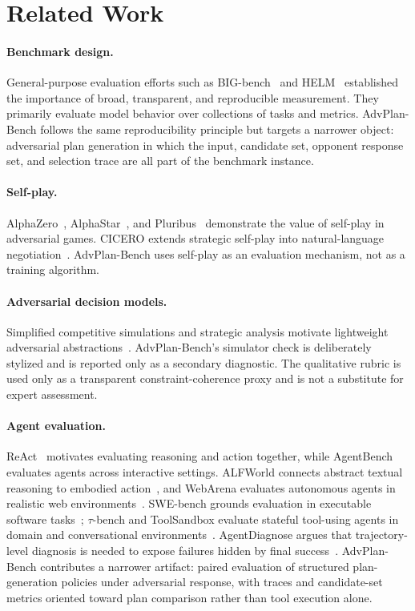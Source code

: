 \documentclass[letterpaper]{article} %
\begin{document}
\section{Related Work}

\paragraph{Benchmark design.}
General-purpose evaluation efforts such as BIG-bench~\citep{srivastava2023beyond} and HELM~\citep{liang2023holistic} established the importance of broad, transparent, and reproducible measurement. They primarily evaluate model behavior over collections of tasks and metrics. AdvPlan-Bench follows the same reproducibility principle but targets a narrower object: adversarial plan generation in which the input, candidate set, opponent response set, and selection trace are all part of the benchmark instance.

\paragraph{Self-play.}
AlphaZero~\citep{silver2018alphazero}, AlphaStar~\citep{vinyals2019alphastar}, and Pluribus~\citep{brown2019superhuman} demonstrate the value of self-play in adversarial games. CICERO extends strategic self-play into natural-language negotiation~\citep{bakhtin2022cicero}. AdvPlan-Bench uses self-play as an evaluation mechanism, not as a training algorithm.

\paragraph{Adversarial decision models.}
Simplified competitive simulations and strategic analysis motivate lightweight adversarial abstractions~\citep{lanchester1916,schelling1960}. AdvPlan-Bench's simulator check is deliberately stylized and is reported only as a secondary diagnostic. The qualitative rubric is used only as a transparent constraint-coherence proxy and is not a substitute for expert assessment.

\paragraph{Agent evaluation.}
ReAct~\citep{yao2023react} motivates evaluating reasoning and action together, while AgentBench~\citep{liu2024agentbench} evaluates agents across interactive settings. ALFWorld connects abstract textual reasoning to embodied action~\citep{shridhar2021alfworld}, and WebArena evaluates autonomous agents in realistic web environments~\citep{zhou2024webarena}. SWE-bench grounds evaluation in executable software tasks~\citep{jimenez2024swebench}; $\tau$-bench and ToolSandbox evaluate stateful tool-using agents in domain and conversational environments~\citep{yao2024taubench,lu2025toolsandbox}. AgentDiagnose argues that trajectory-level diagnosis is needed to expose failures hidden by final success~\citep{ou2025agentdiagnose}. AdvPlan-Bench contributes a narrower artifact: paired evaluation of structured plan-generation policies under adversarial response, with traces and candidate-set metrics oriented toward plan comparison rather than tool execution alone.
\end{document}
